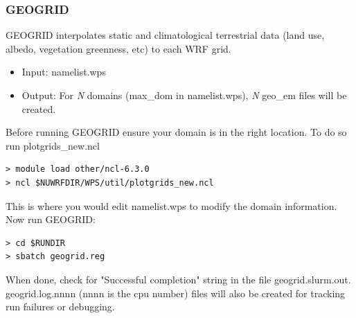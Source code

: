 \begin{frame}[fragile]\frametitle{GEOGRID}

\scriptsize{
GEOGRID interpolates static and climatological terrestrial data (land use, albedo, vegetation greenness, etc) to each WRF grid.
\begin{itemize}
\item Input: namelist.wps
\item Output: For \emph{N} domains (max\_dom in namelist.wps), \emph{N} geo\_em files will be created.
\end{itemize}\scriptsize}    
\hrulefill\par
\scriptsize{Before running GEOGRID ensure your domain is in the right location. To do so run plotgrids\_new.ncl}
\verbatimfont{\scriptsize}%
\begin{verbatim}
> module load other/ncl-6.3.0
> ncl $NUWRFDIR/WPS/util/plotgrids_new.ncl
\end{verbatim}
\scriptsize{This is where you would edit namelist.wps to modify the domain information.
Now run GEOGRID:}
\verbatimfont{\scriptsize}%
\begin{verbatim}
> cd $RUNDIR
> sbatch geogrid.reg
\end{verbatim}
When done, check for  "Successful completion"  string in the file geogrid.slurm.out.
geogrid.log.nnnn (nnnn is the cpu number) files will also be created for tracking run failures or debugging.


\end{frame}

